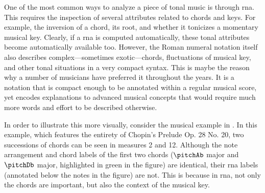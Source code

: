 
One of the most common ways to analyze a piece of tonal
music is through \gls{rna}. This requires the inspection of
several attributes related to chords and keys. For example,
the inversion of a chord, its root, and whether it tonicizes
a momentary musical key. Clearly, if a \gls{rna} is computed
automatically, these tonal attributes become automatically
available too. However, the Roman numeral notation itself
also describes complex---sometimes exotic---chords,
fluctuations of musical key, and other tonal situations in a
very compact syntax. This is maybe the reason why a number
of musicians have preferred it throughout the years. It is a
notation that is compact enough to be annotated within a
regular musical score, yet encodes explanations to advanced
musical concepts that would require much more words and
effort to be described otherwise.

In order to illustrate this more visually, consider the
musical example in . In this
example, which features the entirety of Chopin's Prelude Op.
28 No. 20, two successions of chords can be seen in measures
2 and 12. Although the note arrangement and chord labels of
the first two chords ($\pitchAb$ major and $\pitchDb$ major,
highlighted in green in the figure) are identical, their
\gls{rna} labels (annotated below the notes in the figure)
are not. This is because in \gls{rna}, not only the chords
are important, but also the context of the musical key.




